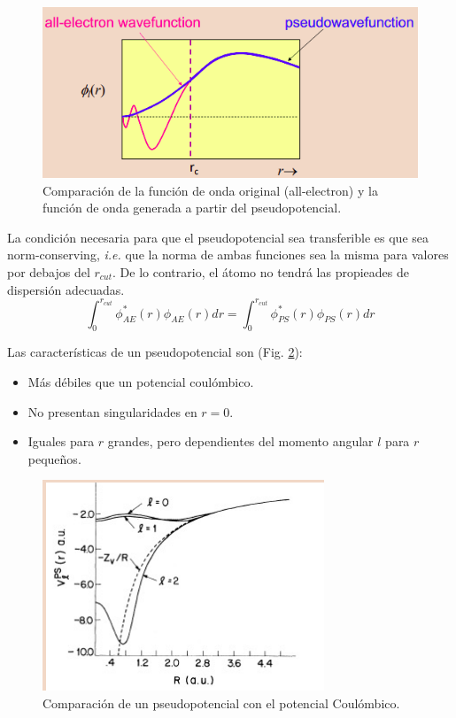 
  \begin{figure}[H]
      \centering
      \includegraphics[scale = 0.6]{figs/D1/pseudo.png}
      \caption{Comparación de la función de onda original (all-electron) y la función de onda generada a partir del pseudopotencial.}
      \label{fig:pseudo}
  \end{figure}

  La condición necesaria para que el pseudopotencial sea transferible es que sea norm-conserving, \emph{i.e.} que la norma de ambas funciones sea la misma para valores por debajos del $r_{cut}$. De lo contrario, el átomo no tendrá las propieades de dispersión adecuadas.
    $$\int_0^{r_{cut}}\phi_{AE}^{*} (r) \phi_{AE} (r) dr = \int_0^{r_{cut}}\phi_{PS}^{*} (r) \phi_{PS} (r) dr$$


  Las características de un pseudopotencial son (Fig. \ref{fig:pseudoo}):
    \begin{itemize}
      \item Más débiles que un potencial coulómbico.
      \item No presentan singularidades en $r=0$.
      \item Iguales para $r$ grandes, pero dependientes del momento angular $l$ para $r$ pequeños.
    \end{itemize}

    \begin{figure}[H]
        \centering
        \includegraphics[scale = 0.6]{figs/D1/pseudoo.png}
        \caption{Comparación de un pseudopotencial con el potencial Coulómbico.}
        \label{fig:pseudoo}
    \end{figure}

